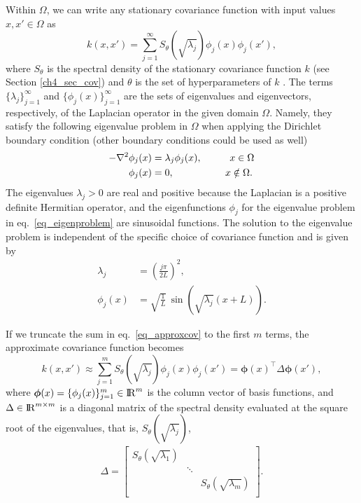 Within $\Omega$, we can write any stationary covariance function with input values $x,x' \in \Omega$ as
%
\begin{equation}\label{eq_approxcov}
k(x,x') = \sum_{j=1}^\infty S_{\theta}(\sqrt{\lambda_j}) \phi_j(x) \phi_j(x'),
\end{equation} 
%
where $S_{\theta}$ is the spectral density of the stationary covariance function $k$ (see Section \ref{ch4_sec_cov}) and $\theta$ is the set of hyperparameters of $k$ \citep{rasmussen2006gaussian}. The terms $\{\lambda_j\}_{j=1}^{\infty}$ and $\{\phi_j(x)\}_{j=1}^{\infty}$ are the sets of eigenvalues and eigenvectors, respectively, of the Laplacian operator in the given domain $\Omega$. Namely, they satisfy the following eigenvalue problem in $\Omega$ when applying the Dirichlet boundary condition (other boundary conditions could be used as well)
%
\begin{align}\label{eq_eigenproblem}
\begin{split}
-\nabla^2 \phi_j(x)&=\lambda_j \phi_j(x), \hspace{1cm}  x \in \Omega \\ 
\phi_j(x)&= 0, \hspace{1.85cm}   x \notin \Omega.
\end{split}
\end{align} 
%
The eigenvalues $\lambda_j>0$ are real and positive because the Laplacian is a positive definite Hermitian operator, and the eigenfunctions $\phi_j$ for the eigenvalue problem in eq.~\eqref{eq_eigenproblem} are sinusoidal functions. The solution to the eigenvalue problem is independent of  the specific choice of covariance function and is given by
%
\begin{align}
\lambda_j&=\left(\frac{j\pi}{2L}\right)^{\!2}, \label{eq_eigenvalue}\\
\phi_j(x)&=\sqrt{\frac{1}{L}}\, \sin\!\!\left(\sqrt{\lambda_j}(x+L)\right). \label{eq_eigenfunction}
\end{align}

If we truncate the sum in eq.~\eqref{eq_approxcov} to the first $m$ terms, the approximate covariance function becomes
%
\begin{equation}
k(x,x') \approx \sum_{j=1}^m S_{\theta}(\sqrt{\lambda_j}) \phi_j(x) \phi_j(x') = \bm{\phi}(x)^\intercal \Delta \bm{\phi}(x'), \nonumber
\end{equation}
%
where $\bm{\phi}(x)=\{\phi_j(x)\}_{j=1}^{m} \in {\rm I\!R}^{m}$ is the column vector of basis functions, and $\Delta  \in {\rm I\!R}^{m\times m}$ is a diagonal matrix of the spectral density evaluated at the square root of the eigenvalues, that is, $S_{\theta}(\sqrt{\lambda_j})$,
%
\begin{align}
\Delta =  \begin{bmatrix}
    S_{\theta}(\sqrt{\lambda_1}) & & \\
    & \ddots & \nonumber \\
    & & S_{\theta}(\sqrt{\lambda_m}) \\
  \end{bmatrix}.
\end{align}

